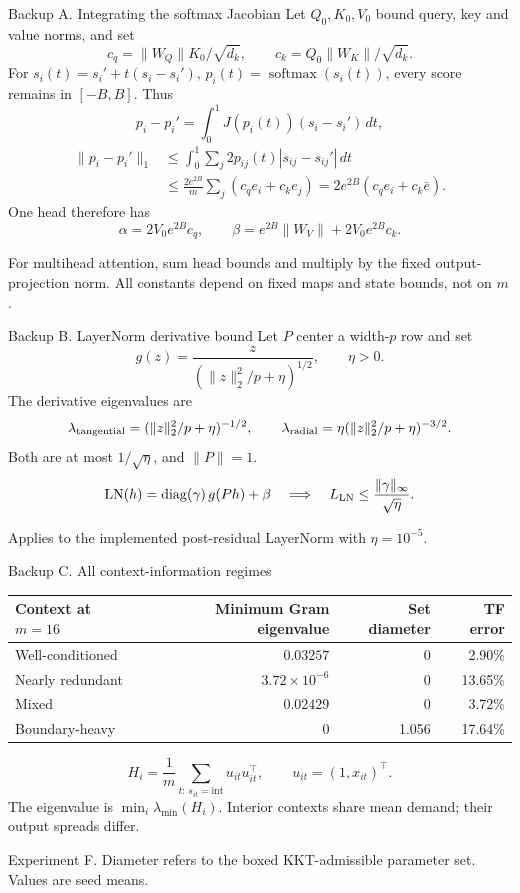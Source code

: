 \documentclass[aspectratio=169,11pt]{beamer}
\newcommand{\source}[1]{\par\vfill{\color{muted}\tiny #1}}
\begin{document}
\begin{frame}[noframenumbering]{Backup A. Integrating the softmax Jacobian}
\small
\setlength{\abovedisplayskip}{3pt}
\setlength{\belowdisplayskip}{3pt}
\setlength{\abovedisplayshortskip}{2pt}
\setlength{\belowdisplayshortskip}{2pt}
Let \(Q_0,K_0,V_0\) bound query, key and value norms, and set
\[
c_q=\|W_Q\|K_0/\sqrt{d_k},\qquad
c_k=Q_0\|W_K\|/\sqrt{d_k}.
\]
For \(s_i(t)=s_i'+t(s_i-s_i')\), \(p_i(t)=\operatorname{softmax}(s_i(t))\),
every score remains in \([-B,B]\). Thus
\[
p_i-p_i'=\int_0^1J(p_i(t))(s_i-s_i')\,dt,
\]
\[
\begin{aligned}
\|p_i-p_i'\|_1
&\le\int_0^1\sum_j2p_{ij}(t)|s_{ij}-s_{ij}'|\,dt\\
&\le\frac{2e^{2B}}m\sum_j(c_qe_i+c_ke_j)
=2e^{2B}(c_qe_i+c_k\bar e).
\end{aligned}
\]
One head therefore has
\[
\alpha=2V_0e^{2B}c_q,\qquad
\beta=e^{2B}\|W_V\|+2V_0e^{2B}c_k.
\]
\source{For multihead attention, sum head bounds and multiply by the fixed
output-projection norm. All constants depend on fixed maps and state bounds,
not on \(m\).}
\end{frame}
\begin{frame}[noframenumbering]{Backup B. LayerNorm derivative bound}
\small
Let \(P\) center a width-\(p\) row and set
\[
g(z)=\frac{z}{(\|z\|_2^2/p+\eta)^{1/2}},\qquad \eta>0.
\]
The derivative eigenvalues are
\[
\lambda_{\rm tangential}
 =(\|z\|_2^2/p+\eta)^{-1/2},
\qquad
\lambda_{\rm radial}
 =\eta(\|z\|_2^2/p+\eta)^{-3/2}.
\]
Both are at most \(1/\sqrt{\eta}\), and \(\|P\|=1\).
\[
\mathrm{LN}(h)=\operatorname{diag}(\gamma)\,g(Ph)+\beta
\quad\Longrightarrow\quad
L_{\rm LN}\le\frac{\|\gamma\|_\infty}{\sqrt{\eta}}.
\]
\source{Applies to the implemented post-residual LayerNorm with \(\eta=10^{-5}\).}
\end{frame}

\begin{frame}[noframenumbering]{Backup C. All context-information regimes}
\begin{center}
\begin{tabular}{lrrr}
\toprule
Context at \(m=16\)&Minimum Gram eigenvalue&Set diameter&TF error\\
\midrule
Well-conditioned&\(0.03257\)&0&2.90\%\\
Nearly redundant&\(3.72\times10^{-6}\)&0&13.65\%\\
Mixed&\(0.02429\)&0&3.72\%\\
Boundary-heavy&0&1.056&17.64\%\\
\bottomrule
\end{tabular}
\end{center}
\vspace{4mm}
\[
H_i=\frac1m\sum_{t:\,s_{it}=\mathrm{int}}u_{it}u_{it}^{\top},
\qquad u_{it}=(1,x_{it})^\top.
\]
\small The eigenvalue is \(\min_i\lambda_{\min}(H_i)\).
Interior contexts share mean demand; their output spreads differ.
\source{Experiment F. Diameter refers to the boxed KKT-admissible parameter set. Values are seed means.}
\end{frame}
\end{document}
